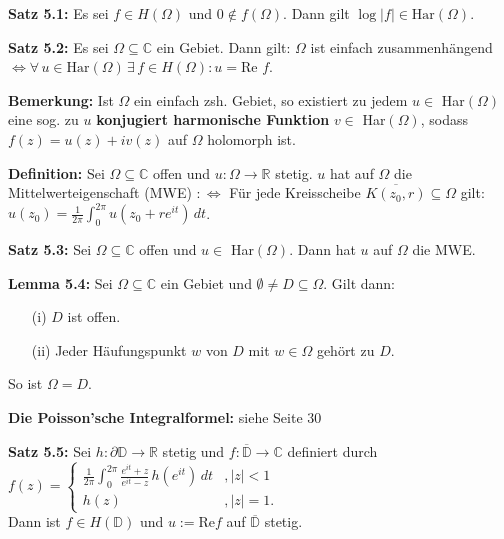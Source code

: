 \documentclass[11pt]{article}
\newcommand{\C}{\mathbb{C}}
\newcommand{\R}{\mathbb{R}}
\newcommand{\D}{\mathbb{D}}
\begin{document}
\textbf{Satz 5.1:} Es sei $f \in H(\Omega)$ und $0 \notin f(\Omega)$. Dann gilt $\log|f| \in \text{Har}(\Omega)$.

\textbf{Satz 5.2:} Es sei $\Omega \subseteq \C$ ein Gebiet. Dann gilt: $\Omega$ ist einfach zusammenhängend $\Leftrightarrow \forall \, u \in \text{Har}(\Omega) \, \exists \, f \in H(\Omega) \colon u = \text{Re }f$.

\textbf{Bemerkung:} Ist $\Omega$ ein einfach zsh. Gebiet, so existiert zu jedem $u \in$ Har$(\Omega)$ eine sog. zu $u$ \textbf{konjugiert harmonische Funktion} $v \in$ Har$(\Omega)$, sodass $f(z) = u(z) + iv(z)$ auf $\Omega$ holomorph ist.

\textbf{Definition:} Sei $\Omega \subseteq \C$ offen und $u \colon \Omega \to \R$ stetig. $u$ hat auf $\Omega$ die Mittelwerteigenschaft (MWE) $:\Leftrightarrow$ Für jede Kreisscheibe $\overline{K(z_0, r)} \subseteq \Omega$ gilt: $u(z_0) = \frac{1}{2\pi} \int_0^{2\pi} u(z_0 + re^{it}) \, dt$.

\textbf{Satz 5.3:} Sei $\Omega \subseteq \C$ offen und $u \in$ Har$(\Omega)$. Dann hat $u$ auf $\Omega$ die MWE.

\textbf{Lemma 5.4:} Sei $\Omega \subseteq \C$ ein Gebiet und $\emptyset \neq D \subseteq \Omega$. Gilt dann:
\vspace{-0.6cm}
\begin{itemize}
\item[(i)] $D$ ist offen. \vspace{-0.2cm}
\item[(ii)] Jeder Häufungspunkt $w$ von $D$ mit $w \in \Omega$ gehört zu $D$.
\end{itemize}
\vspace{-0.6cm}
So ist $\Omega = D$.

\textbf{Die Poisson'sche Integralformel:} siehe Seite 30

\textbf{Satz 5.5:} Sei $h \colon \partial \D \to \R$ stetig und $f \colon \overline{\D} \to \C$ definiert durch \\
$ f(z) =
  \begin{cases} 
\frac{1}{2\pi} \int_0^{2\pi} \frac{e^{it} + z}{e^{it} - z} \, h(e^{it}) \, dt &, |z| < 1 \\ 
h(z) &, |z| = 1.
\end{cases}
$ \\
Dann ist $f \in H(\D)$ und $u := \text{Re} f$ auf $\overline{\D}$ stetig. 
\end{document}

